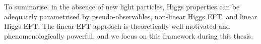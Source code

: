 To summarise, in the absence of new light particles, Higgs properties
can be adequately parametrised by pseudo-observables, non-linear
Higgs EFT, and linear Higgs EFT. The linear EFT approach is
theoretically well-motivated and phenomenologically powerful, and we
focus on this framework during this thesis.





